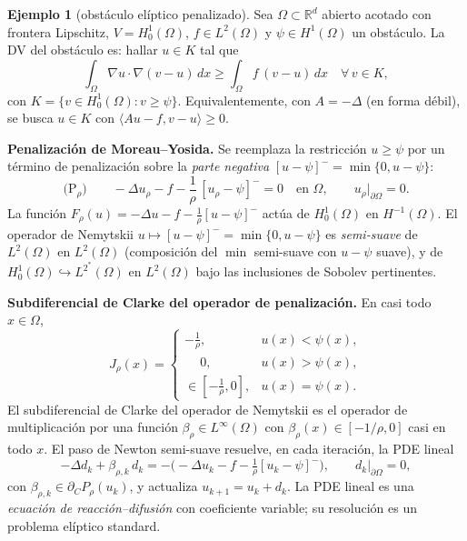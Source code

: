 \documentclass[12pt]{book}
\newcommand{\R}{\mathbb{R}}
\newcommand{\subdiff}{\partial}
\theoremstyle{definition}
\newtheorem{ejemplo}{Ejemplo}[section]
\theoremstyle{plain}
\theoremstyle{remark}
\begin{document}
\begin{ejemplo}[obstáculo elíptico penalizado]
  Sea $\Omega\subset\R^d$ abierto acotado con frontera Lipschitz,
  $V=H^1_0(\Omega)$, $f\in L^2(\Omega)$ y $\psi\in H^1(\Omega)$ un
  obstáculo.  La DV del obstáculo es: hallar $u\in K$ tal que
  \[
    \int_\Omega \nabla u\cdot\nabla(v-u)\,dx
    \ge \int_\Omega f\,(v-u)\,dx
    \quad\forall\, v\in K,
  \]
  con $K=\{v\in H^1_0(\Omega):v\ge\psi\}$.  Equivalentemente, con
  $A=-\Delta$ (en forma débil), se busca $u\in K$ con
  $\langle Au-f,v-u\rangle\ge0$.

  \medskip
  \textbf{Penalización de Moreau--Yosida.}  Se reemplaza la
  restricción $u\ge\psi$ por un término de penalización sobre la
  \emph{parte negativa} $[u-\psi]^{-}=\min\{0,u-\psi\}$:
  \[
    \text{(P$_\rho$)}\qquad
    -\Delta u_\rho - f - \frac1\rho\,[u_\rho-\psi]^{-}=0
    \quad\text{en }\Omega,
    \qquad u_\rho|_{\partial\Omega}=0.
  \]
  La función $F_\rho(u)=-\Delta u-f-\tfrac1\rho[u-\psi]^{-}$ actúa
  de $H^1_0(\Omega)$ en $H^{-1}(\Omega)$.  El operador de
  Nemytskii $u\mapsto[u-\psi]^{-}=\min\{0,u-\psi\}$ es
  \emph{semi-suave} de $L^2(\Omega)$ en $L^2(\Omega)$ (composición
  del $\min$ semi-suave con $u-\psi$ suave), y de
  $H^1_0(\Omega)\hookrightarrow L^{2^*}(\Omega)$ en
  $L^2(\Omega)$ bajo las inclusiones de Sobolev pertinentes.

  \medskip
  \textbf{Subdiferencial de Clarke del operador de penalización.}
  En casi todo $x\in\Omega$,
  \[
    J_\rho(x) =
    \begin{cases}
      -\tfrac1\rho, & u(x)<\psi(x),\\
      \phantom{-}0, & u(x)>\psi(x),\\
      \in[-\tfrac1\rho,0], & u(x)=\psi(x).
    \end{cases}
  \]
  El subdiferencial de Clarke del operador de Nemytskii es el
  operador de multiplicación por una función
  $\beta_\rho\in L^\infty(\Omega)$ con
  $\beta_\rho(x)\in[-1/\rho,0]$ casi en todo $x$.  El paso de
  Newton semi-suave resuelve, en cada iteración, la PDE lineal
  \[
    -\Delta d_k + \beta_{\rho,k}\,d_k
    = -\bigl(-\Delta u_k-f-\tfrac1\rho[u_k-\psi]^{-}\bigr),
    \qquad d_k|_{\partial\Omega}=0,
  \]
  con $\beta_{\rho,k}\in\subdiff_C P_\rho(u_k)$, y actualiza
  $u_{k+1}=u_k+d_k$.  La PDE lineal es una \emph{ecuación de
  reacción--difusión} con coeficiente variable; su resolución es
  un problema elíptico standard.


\end{ejemplo}
\end{document}

